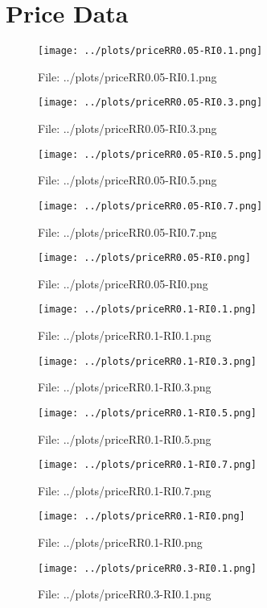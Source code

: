 \documentclass[a4paper, 11pt]{report}
\begin{document}
\section{Price Data}
\begin{figure}[h] \caption{File: ../plots/priceRR0.05-RI0.1.png} \texttt{[image: ../plots/priceRR0.05-RI0.1.png]} \end{figure}
\begin{figure}[h] \caption{File: ../plots/priceRR0.05-RI0.3.png} \texttt{[image: ../plots/priceRR0.05-RI0.3.png]} \end{figure}
\begin{figure}[h] \caption{File: ../plots/priceRR0.05-RI0.5.png} \texttt{[image: ../plots/priceRR0.05-RI0.5.png]} \end{figure}
\begin{figure}[h] \caption{File: ../plots/priceRR0.05-RI0.7.png} \texttt{[image: ../plots/priceRR0.05-RI0.7.png]} \end{figure}
\begin{figure}[h] \caption{File: ../plots/priceRR0.05-RI0.png} \texttt{[image: ../plots/priceRR0.05-RI0.png]} \end{figure}
\begin{figure}[h] \caption{File: ../plots/priceRR0.1-RI0.1.png} \texttt{[image: ../plots/priceRR0.1-RI0.1.png]} \end{figure}
\begin{figure}[h] \caption{File: ../plots/priceRR0.1-RI0.3.png} \texttt{[image: ../plots/priceRR0.1-RI0.3.png]} \end{figure}
\begin{figure}[h] \caption{File: ../plots/priceRR0.1-RI0.5.png} \texttt{[image: ../plots/priceRR0.1-RI0.5.png]} \end{figure}
\begin{figure}[h] \caption{File: ../plots/priceRR0.1-RI0.7.png} \texttt{[image: ../plots/priceRR0.1-RI0.7.png]} \end{figure}
\begin{figure}[h] \caption{File: ../plots/priceRR0.1-RI0.png} \texttt{[image: ../plots/priceRR0.1-RI0.png]} \end{figure}
\begin{figure}[h] \caption{File: ../plots/priceRR0.3-RI0.1.png} \texttt{[image: ../plots/priceRR0.3-RI0.1.png]} \end{figure}
\end{document}
